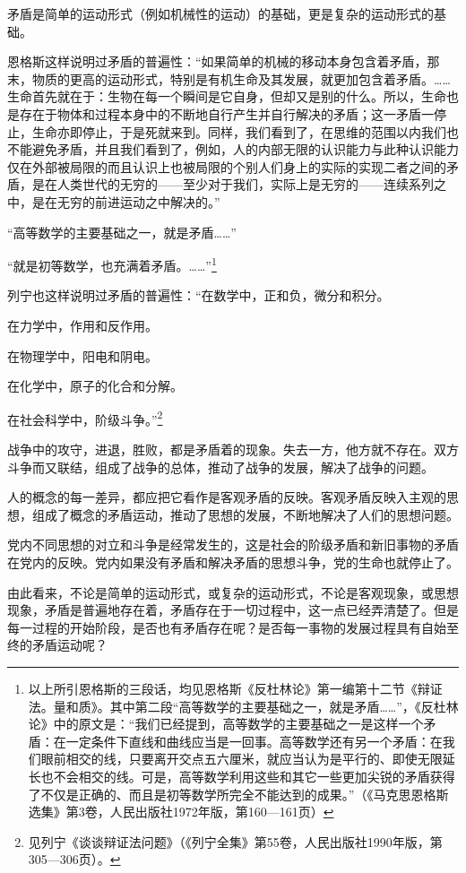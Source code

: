 \documentclass[UTF8, 12pt, a4paper]{ctexrep}
\begin{document}
矛盾是简单的运动形式（例如机械性的运动）的基础，更是复杂的运动形式的基础。

恩格斯这样说明过矛盾的普遍性：“如果简单的机械的移动本身包含着矛盾，那末，物质的更高的运动形式，特别是有机生命及其发展，就更加包含着矛盾。……生命首先就在于：生物在每一个瞬间是它自身，但却又是别的什么。所以，生命也是存在于物体和过程本身中的不断地自行产生并自行解决的矛盾；这一矛盾一停止，生命亦即停止，于是死就来到。同样，我们看到了，在思维的范围以内我们也不能避免矛盾，并且我们看到了，例如，人的内部无限的认识能力与此种认识能力仅在外部被局限的而且认识上也被局限的个别人们身上的实际的实现二者之间的矛盾，是在人类世代的无穷的——至少对于我们，实际上是无穷的——连续系列之中，是在无穷的前进运动之中解决的。”

“高等数学的主要基础之一，就是矛盾……”

“就是初等数学，也充满着矛盾。……”\footnote{以上所引恩格斯的三段话，均见恩格斯《反杜林论》第一编第十二节《辩证法。量和质》。其中第二段“高等数学的主要基础之一，就是矛盾……”，《反杜林论》中的原文是：“我们已经提到，高等数学的主要基础之一是这样一个矛盾：在一定条件下直线和曲线应当是一回事。高等数学还有另一个矛盾：在我们眼前相交的线，只要离开交点五六厘米，就应当认为是平行的、即使无限延长也不会相交的线。可是，高等数学利用这些和其它一些更加尖锐的矛盾获得了不仅是正确的、而且是初等数学所完全不能达到的成果。”（《马克思恩格斯选集》第3卷，人民出版社1972年版，第160—161页）}

列宁也这样说明过矛盾的普遍性：“在数学中，正和负，微分和积分。

在力学中，作用和反作用。

在物理学中，阳电和阴电。

在化学中，原子的化合和分解。

在社会科学中，阶级斗争。”\footnote{见列宁《谈谈辩证法问题》（《列宁全集》第55卷，人民出版社1990年版，第305—306页）。}

战争中的攻守，进退，胜败，都是矛盾着的现象。失去一方，他方就不存在。双方斗争而又联结，组成了战争的总体，推动了战争的发展，解决了战争的问题。

人的概念的每一差异，都应把它看作是客观矛盾的反映。客观矛盾反映入主观的思想，组成了概念的矛盾运动，推动了思想的发展，不断地解决了人们的思想问题。

党内不同思想的对立和斗争是经常发生的，这是社会的阶级矛盾和新旧事物的矛盾在党内的反映。党内如果没有矛盾和解决矛盾的思想斗争，党的生命也就停止了。

由此看来，不论是简单的运动形式，或复杂的运动形式，不论是客观现象，或思想现象，矛盾是普遍地存在着，矛盾存在于一切过程中，这一点已经弄清楚了。但是每一过程的开始阶段，是否也有矛盾存在呢？是否每一事物的发展过程具有自始至终的矛盾运动呢？
\end{document}
